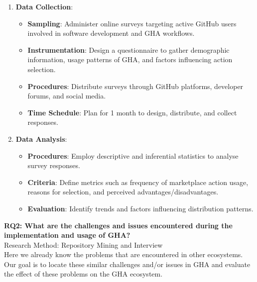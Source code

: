 \documentclass[conference]{IEEEtran}
\begin{document}
    \begin{enumerate}
        \item \textbf{Data Collection}:\\
        \begin{itemize}
            \item \textbf{Sampling}: Administer online surveys targeting active GitHub users involved in software development and GHA workflows.
            \item \textbf{Instrumentation}: Design a questionnaire to gather demographic information, usage patterns of GHA, and factors influencing action selection.
            \item \textbf{Procedures}: Distribute surveys through GitHub platforms, developer forums, and social media.
            \item \textbf{Time Schedule}: Plan for 1 month to design, distribute, and collect responses.\\
        \end{itemize}
        
        \item \textbf{Data Analysis}:\\
        \begin{itemize}
            \item \textbf{Procedures}: Employ descriptive and inferential statistics to analyse survey responses.
            \item \textbf{Criteria}: Define metrics such as frequency of marketplace action usage, reasons for selection, and perceived advantages/disadvantages.
            \item \textbf{Evaluation}: Identify trends and factors influencing distribution patterns.\\
        \end{itemize}
    \end{enumerate}

    \textbf{RQ2: What are the challenges and issues encountered during the implementation and usage of GHA?}\\

    Research Method: Repository Mining and Interview\\

    Here we already know the problems that are encountered in other ecosystems. Our goal is to locate these similar challenges and/or issues in GHA and evaluate the effect of these problems on the GHA ecosystem.\\
\end{document}
